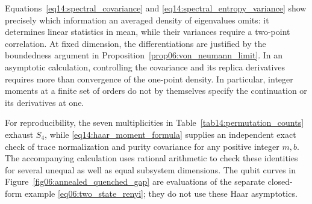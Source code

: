 \documentclass[11pt,letterpaper]{article}
\theoremstyle{plain}
\theoremstyle{definition}
\theoremstyle{remark}
\begin{document}
Equations~\eqref{eq14:spectral_covariance} and
\eqref{eq14:spectral_entropy_variance} show precisely which information
an averaged density of eigenvalues omits: it determines linear
statistics in mean, while their variances require a two-point
correlation.  At fixed dimension, the differentiations are justified
by the boundedness argument in
Proposition~\ref{prop06:von_neumann_limit}.  In an asymptotic
calculation, controlling the covariance and its replica derivatives
requires more than convergence of the one-point density.  In particular,
integer moments at a finite set of orders do not by themselves specify
the continuation or its derivatives at one.

For reproducibility, the seven multiplicities in
Table~\ref{tab14:permutation_counts} exhaust $S_4$, while
\eqref{eq14:haar_moment_formula} supplies an independent exact check of
trace normalization and purity covariance for any positive integer
$m,b$.  The accompanying calculation uses rational arithmetic to check
these identities for several unequal as well as equal subsystem
dimensions.  The qubit curves in Figure~\ref{fig06:annealed_quenched_gap}
are evaluations of the separate closed-form example
\eqref{eq06:two_state_renyi}; they do not use these Haar asymptotics.
\end{document}
